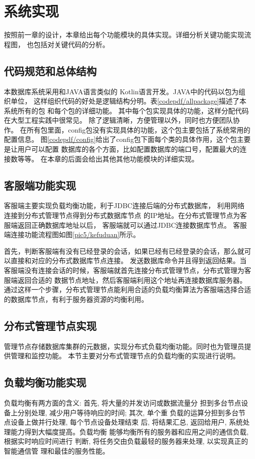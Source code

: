 
\chapter{系统实现}
按照前一章的设计，本章给出每个功能模块的具体实现。详细分析关键功能实现流程图，
也包括对关键代码的分析。
\section{代码规范和总体结构}
本数据库系统采用和JAVA语言类似的
Kotlin语言开发。JAVA中的代码以包为组织单位，
这样组织代码的好处是逻辑结构分明。表\ref{codepdf/allpackage}描述了本系统所有的包
和每个包的详细功能。
其中每个包实现具体的功能，这样分配代码在大型工程实践中很常见。
除了逻辑清晰，方便管理以外，同时也方便团队协作。
在所有包里面，config包没有实现具体的功能，这个包主要包括了系统常用的配置信息。
图\ref{codepdf/config}给出了config包下面每个类的具体作用，这个包主要是让用户可以配置
数据库的各个方面，比如配置数据库的端口号，配置最大的连接数等等。
在本章的后面会给出其他其他功能模块的详细实现。
\section{客服端功能实现}
客服端主要实现负载均衡功能，利于JDBC连接后端的分布式数据库，
利用网络连接到分布式管理节点得到分布式数据库节点
的IP地址。在分布式管理节点为客服端返回正确数据库地址以后，
客服端就可以通过JDBC连接数据库节点。
客服端连接功能流程图如图\ref{pic5/kefuduan}所示。

首先，判断客服端有没有已经登录的会话，如果已经有已经登录的会话，那么就可以直接和对应的分布式数据库节点连接。
发送数据库命令并且得到返回结果。当客服端没有连接会话的时候，客服端就首先连接分布式管理节点，分布式管理为客服端返回合适的
数据节点地址，然后客服端利用这个地址再连接数据库服务器。
通过这样一个步骤，分布式管理节点能利用合适的负载均衡算法为客服端选择合适的数据库节点，有利于服务器资源的均衡利用。
\section{分布式管理节点实现}
管理节点存储数据库集群的元数据，实现分布式负载均衡功能。同时也为管理员提供管理和监控功能。
本节主要对分布式管理节点的负载均衡的实现进行说明。
\section{负载均衡功能实现}
负载均衡有两方面的含义: 首先, 将大量的并发访问或数据流量分
担到多台节点设备上分别处理, 减少用户等待响应的时间; 其次, 单个重
负载的运算分担到多台节点设备上做并行处理, 每个节点设备处理结束
后, 将结果汇总, 返回给用户, 系统处理能力得到大幅度提高。负载均衡
能够均衡所有的服务器和应用之间的通信负载, 根据实时响应时间进行
判断, 将任务交由负载最轻的服务器来处理, 以实现真正的智能通信管
理和最佳的服务性能。


